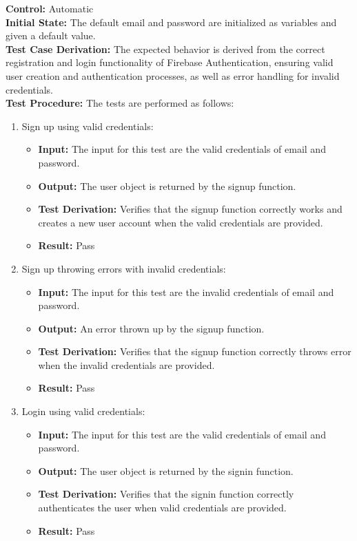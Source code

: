 \documentclass[12pt, titlepage]{article}
\begin{document}
  \textbf{Control:} Automatic \\
  \textbf{Initial State:} The default email and password are initialized as variables and given a default value.\\
  \textbf{Test Case Derivation:} The expected behavior is derived from the correct registration and login functionality of Firebase Authentication, ensuring valid user creation and authentication processes, as well as error handling for invalid credentials.\\
  \textbf{Test Procedure:} The tests are performed as follows:
  \begin{enumerate}
    \item Sign up using valid credentials:
      \begin{itemize}
        \item \textbf{Input:} The input for this test are the valid credentials of email and password.
        \item \textbf{Output:} The user object is returned by the signup function.
        \item \textbf{Test Derivation:} Verifies that the signup function correctly works and creates a new user account when the valid credentials are provided.
        \item \textbf{Result:} Pass 
      \end{itemize}

    \item Sign up throwing errors with invalid credentials:
      \begin{itemize}
        \item \textbf{Input:} The input for this test are the invalid credentials of email and password.
        \item \textbf{Output:} An error thrown up by the signup function.
        \item \textbf{Test Derivation:} Verifies that the signup function correctly throws error when the invalid credentials are provided.
        \item \textbf{Result:} Pass 
      \end{itemize}

    \item Login using valid credentials:
      \begin{itemize}
        \item \textbf{Input:} The input for this test are the valid credentials of email and password. 
        \item \textbf{Output:} The user object is returned by the signin function.
        \item \textbf{Test Derivation:}  Verifies that the signin function correctly authenticates the user when valid credentials are provided.
        \item \textbf{Result:} Pass 
      \end{itemize}


\end{enumerate}
\end{document}
